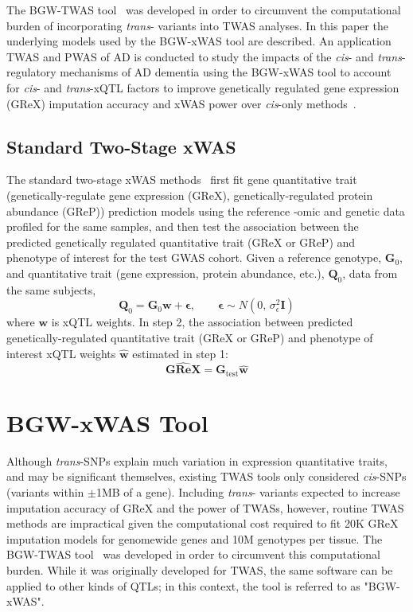 \documentclass[11pt,hidelinks]{article}
\begin{document}
The BGW-TWAS tool~\cite{luninghamBayesianGenomewideTWAS2020} was developed in order to circumvent the computational burden of incorporating \textit{trans}- variants into TWAS analyses. In this paper the underlying models used by the BGW-xWAS tool are described. An application TWAS and PWAS of AD is conducted to study the impacts of the \textit{cis}- and \textit{trans}- regulatory mechanisms of AD dementia using the BGW-xWAS tool to account for \textit{cis}- and \textit{trans}-xQTL factors to improve genetically regulated gene expression (GReX) imputation accuracy and xWAS power over \textit{cis}-only methods~\cite{luninghamBayesianGenomewideTWAS2020}. 


\subsection{Standard Two-Stage xWAS} %
The standard two-stage xWAS methods~\cite{gamazonGenebasedAssociationMethod2015, gusevIntegrativeApproachesLargescale2016, nagpalTIGARImprovedBayesian2019,huProteomewideAssociationStudies2025} first fit gene quantitative trait (genetically-regulate gene expression (GReX), genetically-regulated protein abundance (GReP)) prediction models using the reference -omic and genetic data profiled for the same samples, and then test the association between the predicted genetically regulated quantitative trait (GReX or GReP) and phenotype of interest for the test GWAS cohort. Given a reference genotype, $\textbf{G}_0$, and quantitative trait (gene expression, protein abundance, etc.), $\textbf{Q}_0$, data from the same subjects, 
\[\textbf{Q}_0 = \textbf{G}_0 \textbf{w} + \boldsymbol{\epsilon}, \qquad \boldsymbol{\epsilon} \sim N(0,\, \sigma^2_{\epsilon}\textbf{I})\]
where $\textbf{w}$ is xQTL weights. In step 2, the association between predicted genetically-regulated quantitative trait (GReX or GReP) and phenotype of interest xQTL weights $\hat{\textbf{w}}$ estimated in step 1: 
\[\widehat{\textbf{GReX}} = \textbf{G}_{\text{test}} \hat{\textbf{w}}\]



\section{BGW-xWAS Tool}

Although \textit{trans}-SNPs explain much variation in expression quantitative traits, and may be significant themselves, existing TWAS tools only considered \textit{cis}-SNPs (variants within $\pm$1MB of a gene). Including \textit{trans}- variants expected to increase imputation accuracy of GReX and the power of TWASs, however, routine TWAS methods are impractical given the computational cost required to fit 20K GReX imputation models for genomewide genes and 10M genotypes per tissue. The BGW-TWAS tool~\cite{luninghamBayesianGenomewideTWAS2020} was developed in order to circumvent this computational burden. While it was originally developed for TWAS, the same software can be applied to other kinds of QTLs; in this context, the tool is referred to as "BGW-xWAS".
\end{document}
